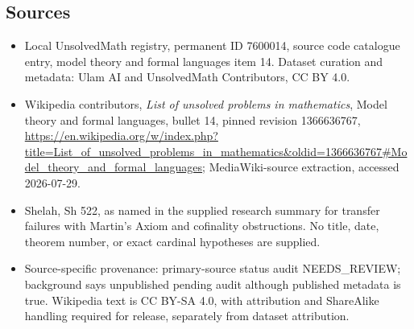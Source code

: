 \documentclass[11pt]{article}
\begin{document}
\subsection{Sources}
\begin{itemize}
\item Local UnsolvedMath registry, permanent ID 7600014, source code catalogue entry, model theory and formal languages item 14. Dataset curation and metadata: Ulam AI and UnsolvedMath Contributors, CC BY 4.0.
\item Wikipedia contributors, \emph{List of unsolved problems in mathematics}, Model theory and formal languages, bullet 14, pinned revision 1366636767, \url{https://en.wikipedia.org/w/index.php?title=List_of_unsolved_problems_in_mathematics&oldid=1366636767#Model_theory_and_formal_languages}; MediaWiki-source extraction, accessed 2026-07-29.
\item Shelah, Sh 522, as named in the supplied research summary for transfer failures with Martin's Axiom and cofinality obstructions. No title, date, theorem number, or exact cardinal hypotheses are supplied.
\item Source-specific provenance: primary-source status audit NEEDS\_REVIEW; background says unpublished pending audit although published metadata is true. Wikipedia text is CC BY-SA 4.0, with attribution and ShareAlike handling required for release, separately from dataset attribution.
\end{itemize}
\end{document}
